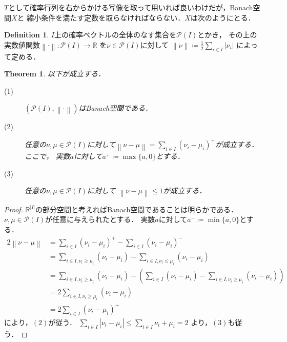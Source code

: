 \documentclass[dvipdfmx,autodetect-engine]{jsarticle}
\newtheorem{theorem}{Theorem}[section]
\theoremstyle{remark}
\theoremstyle{definition}
\newtheorem{definition}{Definition}[section]
\newcommand{\R}{\mathbb{R}}
\newcommand{\abs}[1]{\left\lvert#1\right\rvert}%
\newcommand{\norm}[1]{\left\lVert#1\right\rVert}%
\begin{document}
$T$として確率行列を右からかける写像を取って用いれば良いわけだが，Banach空間$X$と
縮小条件を満たす定数を取らなければならない．$X$は次のようにとる．


\begin{definition}
    $I$上の確率ベクトルの全体のなす集合を$\mathcal{P}(I)$とかき，
    その上の実数値関数$\norm{\cdot} \colon \mathcal{P}(I) \to \R$
    を$\nu \in \mathcal{P}(I)$に対して
    $\norm{\nu} \coloneqq \frac{1}{2} \sum_{i \in I}\abs{\nu_{i}}$
    によって定める．
\end{definition}


\begin{theorem}\label{norm_distribution}
    以下が成立する．
    \begin{description}
        \item[(1)] $(\mathcal{P}(I),\norm{\cdot})$はBanach空間である．
        \item[(2)] 任意の$\nu,\mu \in \mathcal{P}(I)$に対して$\norm{\nu - \mu} = 
         \sum_{i \in I} (\nu_{i} - \mu_{i})^{+}$が成立する．ここで，
        実数$a$に対して$a^{+} \coloneqq \max\{a,0\}$とする．
        \item[(3)] 任意の$\nu,\mu \in \mathcal{P}(I)$に対して
        $\norm{\nu - \mu} \leq 1$が成立する．
    \end{description}
\end{theorem}


\begin{proof}
    $\R^{\abs{I}}$の部分空間と考えればBanach空間であることは明らかである．
    $\nu,\mu\in \mathcal{P}(I)$が任意に与えられたとする．
    実数$a$に対して$a^{-} \coloneqq \min\{a,0\}$とする．
    \begin{align}
        2\norm{\nu-\mu} &=  \sum_{i \in I} (\nu_{i} - \mu_{i})^{+} 
        -  \sum_{i \in I} (\nu_{i} - \mu_{i})^{-}\\
        &= \sum_{i \in I, \nu_{i} \geq \mu_{i}} (\nu_{i} - \mu_{i}) 
        - \sum_{i \in I, \nu_{i} \leq \mu_{i}} (\nu_{i} - \mu_{i}) \\
        &= \sum_{i \in I, \nu_{i} \geq \mu_{i}} (\nu_{i} - \mu_{i}) 
        - \left(\sum_{i \in I} (\nu_{i} - \mu_{i})  
        - \sum_{i \in I,\nu_{i} \geq \mu_{i} }(\nu_{i} - \mu_{i}) \right)\\
        &= 2 \sum_{i \in I, \nu_{i} \geq \mu_{i}} (\nu_{i} - \mu_{i}) \\
        &= 2 \sum_{i \in I} (\nu_{i} - \mu_{i})^{+}
    \end{align}
    により，$(2)$が従う．
    $\sum_{i \in I} \abs{\nu_{i} - \mu_{i}} \leq \sum_{i \in I} \nu_{i} + \mu_{i} = 2$
    より，$(3)$も従う．
\end{proof}
\end{document}
